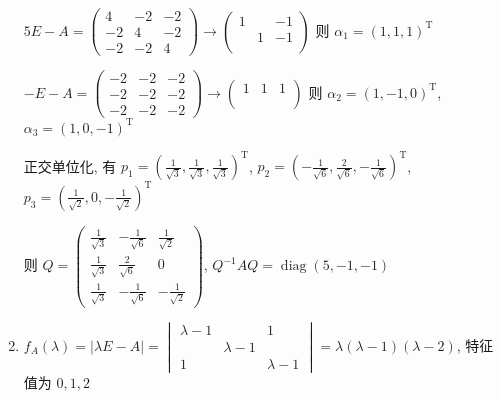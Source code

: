 \begin{enumerate}
			       \( 5E-A = \begin{pmatrix}
				       4  & -2 & -2 \\
				       -2 & 4  & -2 \\
				       -2 & -2 & 4
			       \end{pmatrix} \rightarrow \begin{pmatrix}
				       1 &   & -1 \\
				         & 1 & -1 \\
				         &   &
			       \end{pmatrix} \) 则 \( \alpha_{1} = (1, 1, 1)^{\mathrm{T}} \)

			       \( -E-A = \begin{pmatrix}
				       -2 & -2 & -2 \\
				       -2 & -2 & -2 \\
				       -2 & -2 & -2
			       \end{pmatrix} \rightarrow \begin{pmatrix}
				       1 & 1 & 1 \\
				         &   &   \\
				         &   &
			       \end{pmatrix} \) 则 \( \alpha_{2} = (1, -1, 0)^{\mathrm{T}} \), \( \alpha_{3} = (1, 0, -1)^{\mathrm{T}} \)

			       正交单位化, 有 \( p_{1} = \left( \frac{1}{\sqrt{3}}, \frac{1}{\sqrt{3}}, \frac{1}{\sqrt{3}} \right)^{\mathrm{T}} \), \( p_{2} = \left( -\frac{1}{\sqrt{6}}, \frac{2}{\sqrt{6}}, -\frac{1}{\sqrt{6}} \right)^{\mathrm{T}} \), \( p_{3} = \left( \frac{1}{\sqrt{2}}, 0, -\frac{1}{\sqrt{2}} \right)^{\mathrm{T}} \)

			       则 \( Q = \begin{pmatrix}
				       \frac{1}{\sqrt{3}} & -\frac{1}{\sqrt{6}} & \frac{1}{\sqrt{2}}  \\
				       \frac{1}{\sqrt{3}} & \frac{2}{\sqrt{6}}  & 0                   \\
				       \frac{1}{\sqrt{3}} & -\frac{1}{\sqrt{6}} & -\frac{1}{\sqrt{2}}
			       \end{pmatrix} \), \( Q^{-1}AQ = \operatorname{diag}(5, -1, -1) \)
			 \item %
			       \( f_{A}(\lambda) = |\lambda E - A| = \begin{vmatrix}
				       \lambda-1 &           & 1         \\
				                 & \lambda-1 &           \\
				       1         &           & \lambda-1
			       \end{vmatrix} = \lambda(\lambda-1)(\lambda-2) \), 特征值为 \( 0, 1, 2 \)


\end{enumerate}
